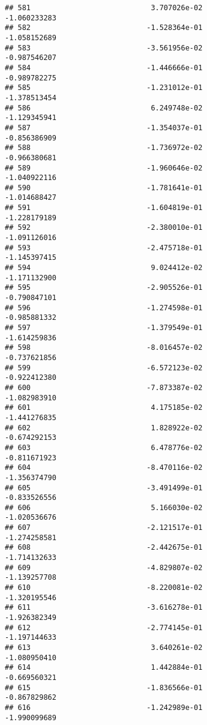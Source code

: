 \documentclass[
]{article}
\begin{document}
\begin{verbatim}
## 581                            3.707026e-02               -1.060233283
## 582                           -1.528364e-01               -1.058152689
## 583                           -3.561956e-02               -0.987546207
## 584                           -1.446666e-01               -0.989782275
## 585                           -1.231012e-01               -1.378513454
## 586                            6.249748e-02               -1.129345941
## 587                           -1.354037e-01               -0.856386909
## 588                           -1.736972e-02               -0.966380681
## 589                           -1.960646e-02               -1.040922116
## 590                           -1.781641e-01               -1.014688427
## 591                           -1.604819e-01               -1.228179189
## 592                           -2.380010e-01               -1.091126016
## 593                           -2.475718e-01               -1.145397415
## 594                            9.024412e-02               -1.171132900
## 595                           -2.905526e-01               -0.790847101
## 596                           -1.274598e-01               -0.985881332
## 597                           -1.379549e-01               -1.614259836
## 598                           -8.016457e-02               -0.737621856
## 599                           -6.572123e-02               -0.922412380
## 600                           -7.873387e-02               -1.082983910
## 601                            4.175185e-02               -1.441276835
## 602                            1.828922e-02               -0.674292153
## 603                            6.478776e-02               -0.811671923
## 604                           -8.470116e-02               -1.356374790
## 605                           -3.491499e-01               -0.833526556
## 606                            5.166030e-02               -1.020536676
## 607                           -2.121517e-01               -1.274258581
## 608                           -2.442675e-01               -1.714132633
## 609                           -4.829807e-02               -1.139257708
## 610                           -8.220081e-02               -1.320195546
## 611                           -3.616278e-01               -1.926382349
## 612                           -2.774145e-01               -1.197144633
## 613                            3.640261e-02               -1.080950410
## 614                            1.442884e-01               -0.669560321
## 615                           -1.836566e-01               -0.867829862
## 616                           -1.242989e-01               -1.990099689

\end{verbatim}
\end{document}
